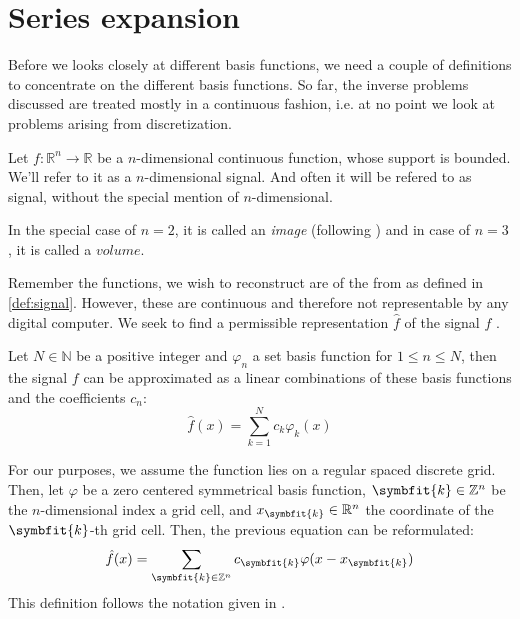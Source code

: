 \section{Series expansion}

Before we looks closely at different basis functions, we need a couple of definitions to concentrate
on the different basis functions. So far, the inverse problems discussed are treated mostly in a
continuous fashion, i.e. at no point we look at problems arising from discretization.

\begin{definition}[Signal]
    \label{def:signal}
    Let $f: \mathbb{R}^n \to \mathbb{R}$ be a $n$-dimensional continuous function, whose support is 
    bounded. We'll refer to it as a $n$-dimensional signal. And often it will be refered to as signal, 
    without the special mention of $n$-dimensional.

    In the special case of $n=2$, it is called an \textit{image} (following \cite{herman_basis_2015})
    and in case of $n=3$, it is called a $volume$.
\end{definition}

Remember the functions, we wish to reconstruct are of the from as defined in \ref{def:signal}.
However, these are continuous and therefore not representable by any digital computer.
We seek to find a permissible representation $\hat{f}$ of the signal $f$ \cite{herman_basis_2015}.

\begin{definition}
    \label{def:permissible_representation}
    Let $N \in \mathbb{N}$ be a positive integer and $\varphi_n$ a set basis function for
    $1 \leq n \leq N$, then the signal $f$ can be approximated as a linear combinations
    of these basis functions and the coefficients $c_n$:
    \[ \hat{f}(x) = \sum_{k=1}^{N} c_k \varphi_k(x) \]

    For our purposes, we assume the function lies on a regular spaced discrete grid. Then, let
    $\varphi$ be a zero centered symmetrical basis function, $\symbfit{k} \in \mathbb{Z}^n$ be the
    $n$-dimensional index a grid cell, and $x_{\symbfit{k}} \in \mathbb{R}^n$ the coordinate of the
    $\symbfit{k}$-th grid cell. Then, the previous equation can be reformulated:
    \[ \hat{f}(x) = \sum_{\symbfit{k} \in \mathbb{Z}^n} c_{\symbfit{k}} \varphi(x - x_{\symbfit{k}}) \]
    This definition follows the notation given in \cite{momey_new_2011}.
\end{definition}

